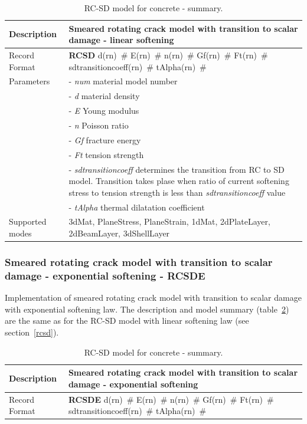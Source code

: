 \documentclass[a4paper]{article}
\newcommand{\descitem}[1]{{\noindent \bf #1}}
\newcommand{\elemparam}[2]{{{#1\tiny (#2)}~\#}}
\newcommand{\param}[1]{{\it #1}}
\begin{document}
\begin{table}[!htb]
\begin{tabular}{|l|p{9cm}|}
\hline
Description & Smeared rotating crack model with transition to scalar
damage - linear softening\\
\hline
Record Format & \descitem{RCSD} \elemparam{d}{rn} \elemparam{E}{rn}
\elemparam{n}{rn} \elemparam{Gf}{rn} \elemparam{Ft}{rn} \elemparam{sdtransitioncoeff}{rn} \elemparam{tAlpha}{rn} \\
Parameters &- \param{num} material model number\\
&- \param{d} material density\\
&- \param{E} Young modulus\\
&- \param{n} Poisson ratio\\
&- \param{Gf} fracture energy\\
&- \param{Ft} tension strength\\
&- \param{sdtransitioncoeff} determines the transition from RC to SD
model. Transition takes plase when ratio of current softening
stress to tension strength is less than  \param{sdtransitioncoeff} value\\
&- \param{tAlpha} thermal dilatation coefficient\\
Supported modes& 3dMat, PlaneStress, PlaneStrain, 1dMat,
2dPlateLayer, 2dBeamLayer, 3dShellLayer\\
\hline
\end{tabular}
\caption{RC-SD model for  concrete - summary.}
\label{rcsd_table}
\end{table}



\subsubsection{Smeared rotating crack model with transition to scalar
damage - exponential softening - RCSDE}
\label{rcsde}
Implementation of smeared rotating crack model with transition to
scalar damage with exponential softening law.
The description and model summary (table~\ref{rcsde_table}) are the
same as for the RC-SD model with linear softening law (see section~\ref{rcsd}).
\begin{table}[!htb]
\begin{tabular}{|l|p{9cm}|}
\hline
Description & Smeared rotating crack model with transition to scalar
damage - exponential softening\\
\hline
Record Format & \descitem{RCSDE} \elemparam{d}{rn} \elemparam{E}{rn}
\elemparam{n}{rn} \elemparam{Gf}{rn} \elemparam{Ft}{rn} \elemparam{sdtransitioncoeff}{rn} \elemparam{tAlpha}{rn} \\
\hline
\end{tabular}
\caption{RC-SD model for  concrete - summary.}
\label{rcsde_table}
\end{table}
\end{document}
